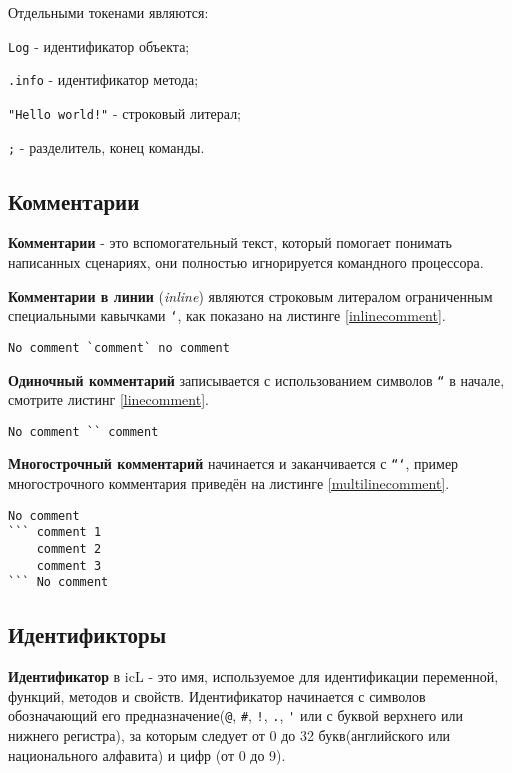 Отдельными токенами являются:

\begin{icItems}
\item
	\lstinline`Log` - идентификатор объекта;
\item
	\lstinline`.info` - идентификатор метода;
\item
	\lstinline`"Hello world!"` - строковый литерал;
\item
	\lstinline`;` - разделитель, конец команды.
\end{icItems}

\subsection{Комментарии}

\textbf{Комментарии} - это вспомогательный текст, который помогает понимать написанных сценариях, они полностью игнорируется командного процессора.

\textbf{Комментарии в линии} (\textit{inline}) являются строковым литералом ограниченным специальными кавычками \texttt{`}, как показано на листинге \ref{inlinecomment}.

\begin{lstlisting}[caption=Комментарий в линии,label=inlinecomment]
No comment `comment` no comment
\end{lstlisting}

\textbf{Одиночный комментарий} записывается с использованием символов \texttt{``} в начале, смотрите листинг \ref{linecomment}.

\begin{lstlisting}[caption=Одиночный комментарий,label=linecomment]
No comment `` comment
\end{lstlisting}

\textbf{Многострочный комментарий} начинается и заканчивается с \texttt{```}, пример многострочного комментария приведён на листинге \ref{multilinecomment}.

\begin{lstlisting}[caption=Многострочный комментарий,label=multilinecomment]
No comment
``` comment 1
	comment 2
	comment 3
``` No comment
\end{lstlisting}

\subsection{Идентификторы}

\textbf{Идентификатор} в icL - это имя, используемое для идентификации переменной, функций, методов и свойств. Идентификатор начинается с символов обозначающий его предназначение(\lstinline`@`, \lstinline`#`, \lstinline`!`, \lstinline`.`, \lstinline`'` или с буквой верхнего или нижнего регистра), за которым следует от 0 до 32 букв(английского или национального алфавита) и цифр (от 0 до 9).

